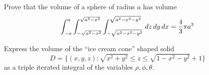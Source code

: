 \documentclass[letterpaper, twoside, 12pt]{book}
\begin{document}
          \begin{problem}
            Prove that the volume of a sphere of radius $a$ has
            volume
              \[
                \int_{-a}^a
                \int_{-\sqrt{a^2-x^2}}^{\sqrt{a^2-x^2}}
                \int_{-\sqrt{a^2-x^2-y^2}}^{\sqrt{a^2-x^2-y^2}}
                \,d{z}\,d{y}\,d{x}
                  =
                \frac{4}{3}\pi a^3
              \]
          \end{problem}

          \begin{solution}

          \end{solution}

          \begin{contributors}

          \end{contributors}

          \begin{problem}
            Express the volume of the ``ice cream cone'' shaped solid
              \[
                D
                  =
                \{
                  (x,y,z)
                :
                  \sqrt{x^2+y^2} \leq z\leq \sqrt{1-x^2-y^2}+1
                \}
              \]
            as a triple iterated integral of the variables $\rho,\phi,\theta$.
          \end{problem}

          \begin{solution}

          \end{solution}

          \begin{contributors}

          \end{contributors}
\end{document}

